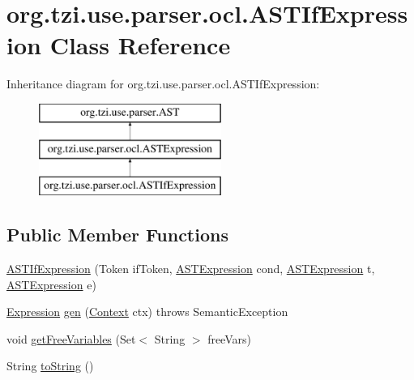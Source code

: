 \hypertarget{classorg_1_1tzi_1_1use_1_1parser_1_1ocl_1_1_a_s_t_if_expression}{\section{org.\-tzi.\-use.\-parser.\-ocl.\-A\-S\-T\-If\-Expression Class Reference}
\label{classorg_1_1tzi_1_1use_1_1parser_1_1ocl_1_1_a_s_t_if_expression}
}
Inheritance diagram for org.\-tzi.\-use.\-parser.\-ocl.\-A\-S\-T\-If\-Expression\-:\begin{figure}[H]
\begin{center}
\leavevmode
\includegraphics[height=3.000000cm]{classorg_1_1tzi_1_1use_1_1parser_1_1ocl_1_1_a_s_t_if_expression}
\end{center}
\end{figure}
\subsection*{Public Member Functions}
\begin{DoxyCompactItemize}
\item 
\hyperlink{classorg_1_1tzi_1_1use_1_1parser_1_1ocl_1_1_a_s_t_if_expression_a3f417084b203e814ea14251b8c811e9c}{A\-S\-T\-If\-Expression} (Token if\-Token, \hyperlink{classorg_1_1tzi_1_1use_1_1parser_1_1ocl_1_1_a_s_t_expression}{A\-S\-T\-Expression} cond, \hyperlink{classorg_1_1tzi_1_1use_1_1parser_1_1ocl_1_1_a_s_t_expression}{A\-S\-T\-Expression} t, \hyperlink{classorg_1_1tzi_1_1use_1_1parser_1_1ocl_1_1_a_s_t_expression}{A\-S\-T\-Expression} e)
\item 
\hyperlink{classorg_1_1tzi_1_1use_1_1uml_1_1ocl_1_1expr_1_1_expression}{Expression} \hyperlink{classorg_1_1tzi_1_1use_1_1parser_1_1ocl_1_1_a_s_t_if_expression_acffcd195fcc27da6fe0439a08d3106bb}{gen} (\hyperlink{classorg_1_1tzi_1_1use_1_1parser_1_1_context}{Context} ctx)  throws Semantic\-Exception 
\item 
void \hyperlink{classorg_1_1tzi_1_1use_1_1parser_1_1ocl_1_1_a_s_t_if_expression_a294f869229d3cd2e71c278f9bdff4d5a}{get\-Free\-Variables} (Set$<$ String $>$ free\-Vars)
\item 
String \hyperlink{classorg_1_1tzi_1_1use_1_1parser_1_1ocl_1_1_a_s_t_if_expression_a33b2d7bf4d17dcff1c9a7e9a867ff80a}{to\-String} ()
\end{DoxyCompactItemize}
